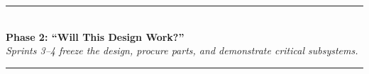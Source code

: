 \vspace{0.5em}
\begin{center}
\textcolor{minesblue}{\rule{0.6\textwidth}{1pt}}\\[4pt]
{\Large\bfseries\sffamily\color{minesblue} Phase 2: ``Will This Design Work?''}\\[2pt]
{\small\itshape Sprints 3--4 freeze the design, procure parts, and demonstrate critical subsystems.}\\[4pt]
\textcolor{minesblue}{\rule{0.6\textwidth}{1pt}}
\end{center}
\vspace{0.5em}
